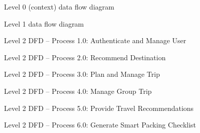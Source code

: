 \begin{figure}[htbp]
  \centering
  \caption{Level 0 (context) data flow diagram}
  \label{fig:dfd0}
\end{figure}

\begin{figure}
  \centering
  \caption{Level 1 data flow diagram}
  \label{fig:dfd1}
\end{figure}

\begin{figure}[htbp]
  \centering
  \caption{Level 2 DFD -- Process 1.0: Authenticate and Manage User}
  \label{fig:dfd2-p1}
\end{figure}

\begin{figure}[htbp]
  \centering
  \caption{Level 2 DFD -- Process 2.0: Recommend Destination}
  \label{fig:dfd2-p2}
\end{figure}

\begin{figure}[htbp]
  \centering
  \caption{Level 2 DFD -- Process 3.0: Plan and Manage Trip}
  \label{fig:dfd2-p3}
\end{figure}

\begin{figure}[htbp]
  \centering
  \caption{Level 2 DFD -- Process 4.0: Manage Group Trip}
  \label{fig:dfd2-p4}
\end{figure}

\begin{figure}[htbp]
  \centering
  \caption{Level 2 DFD -- Process 5.0: Provide Travel Recommendations}
  \label{fig:dfd2-p5}
\end{figure}

\begin{figure}[htbp]
  \centering
  \caption{Level 2 DFD -- Process 6.0: Generate Smart Packing Checklist}
  \label{fig:dfd2-p6}
\end{figure}

